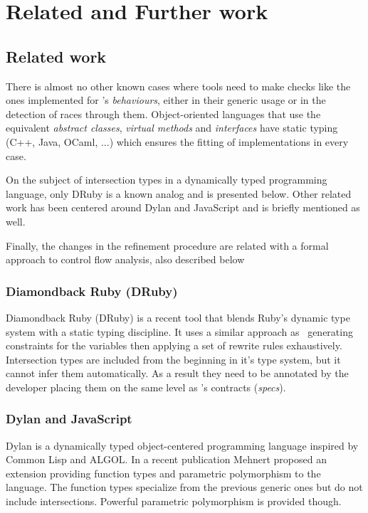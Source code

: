 \chapter{Related and Further work}

\section{Related work}
\label{sct:related_work}

There is almost no other known cases where tools need to make checks
like the ones implemented for \er's \emph{behaviours}, either in their
generic usage or in the detection of races through
them. Object-oriented languages that use the equivalent \emph{abstract
  classes}, \emph{virtual methods} and \emph{interfaces} have static
typing (C++, Java, OCaml, ...) which ensures the fitting of
implementations in every case.

On the subject of intersection types in a dynamically typed
programming language, only DRuby is a known analog and is presented
below. Other related work has been centered around Dylan and
JavaScript and is briefly mentioned as well.

Finally, the changes in the refinement procedure are related with a
formal approach to control flow analysis, also described below

\subsection{Diamondback Ruby (DRuby)}

Diamondback Ruby (DRuby)\cite{druby} is a recent tool that blends
Ruby's dynamic type system with a static typing discipline. It uses a
similar approach as \dr\ generating constraints for the variables then
applying a set of rewrite rules exhaustively. Intersection types are
included from the beginning in it's type system, but it cannot infer
them automatically. As a result they need to be annotated by the
developer placing them on the same level as \dr's contracts
(\emph{specs}).

\subsection{Dylan and JavaScript}

Dylan is a dynamically typed object-centered programming language
inspired by Common Lisp and ALGOL. In a recent publication Mehnert
proposed an extension providing function types and parametric
polymorphism to the language\cite{dylan}. The function types
specialize from the previous generic ones but do not include
intersections. Powerful parametric polymorphism is provided though.

